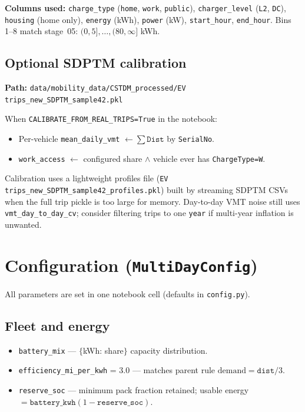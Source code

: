 \documentclass[11pt,a4paper]{article}
\begin{document}
\textbf{Columns used:} \texttt{charge\_type} (\texttt{home}, \texttt{work}, \texttt{public}), \texttt{charger\_level} (\texttt{L2}, \texttt{DC}), \texttt{housing} (home only), \texttt{energy} (kWh), \texttt{power} (kW), \texttt{start\_hour}, \texttt{end\_hour}. Bins 1--8 match stage~05: $(0,5],\ldots,(80,\infty]$ kWh.

\subsection{Optional SDPTM calibration}
\textbf{Path:} \texttt{data/mobility\_data/CSTDM\_processed/EV trips\_new\_SDPTM\_sample42.pkl}

When \texttt{CALIBRATE\_FROM\_REAL\_TRIPS=True} in the notebook:
\begin{itemize}[noitemsep]
  \item Per-vehicle \texttt{mean\_daily\_vmt} $\leftarrow \sum \texttt{Dist}$ by \texttt{SerialNo}.
  \item \texttt{work\_access} $\leftarrow$ configured share $\land$ vehicle ever has \texttt{ChargeType=W}.
\end{itemize}
Calibration uses a lightweight profiles file (\texttt{EV trips\_new\_SDPTM\_sample42\_profiles.pkl}) built by streaming SDPTM CSVs when the full trip pickle is too large for memory. Day-to-day VMT noise still uses \texttt{vmt\_day\_to\_day\_cv}; consider filtering trips to one \texttt{year} if multi-year inflation is unwanted.

\section{Configuration (\texttt{MultiDayConfig})}

All parameters are set in one notebook cell (defaults in \texttt{config.py}).

\subsection{Fleet and energy}
\begin{itemize}[noitemsep]
  \item \texttt{battery\_mix} --- $\{$kWh: share$\}$ capacity distribution.
  \item \texttt{efficiency\_mi\_per\_kwh} = 3.0 --- matches parent rule $\text{demand} = \texttt{dist}/3$.
  \item \texttt{reserve\_soc} --- minimum pack fraction retained; usable energy $= \texttt{battery\_kwh}(1-\texttt{reserve\_soc})$.
\end{itemize}
\end{document}
